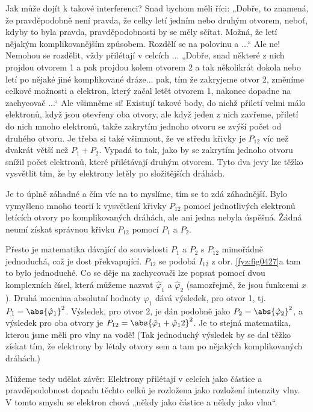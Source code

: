     Jak může dojít k takové interferenci? Snad bychom měli říci: „Dobře, to znamená, že
    pravděpodobně není pravda, že celky letí jedním nebo druhým otvorem, neboť, kdyby to byla
    pravda, pravděpodobnosti by se měly sčítat. Možná, že letí nějakým komplikovanějším způsobem.
    Rozdělí se na polovinu a ...“ Ale ne! Nemohou se rozdělit, vždy přilétají v celcích ... „Dobře,
    snad některé z nich projdou otvorem 1 a pak projdou kolem otvorem 2 a tak několikrát dokola nebo
    letí po nějaké jiné komplikované dráze... pak, tím že zakryjeme otvor 2, změníme celkové
    možnosti a elektron, který začal letět otvorem 1, nakonec dopadne na zachycovač ...“ Ale
    všimněme si! Existují takové body, do nichž přiletí velmi málo elektronů, když jsou otevřeny oba
    otvory, ale když jeden z nich zavřeme, přiletí do nich mnoho elektronů, takže zakrytím jednoho
    otvoru se zvýší počet od druhého otvoru. Je třeba si také všimnout, že ve středu křivky je
    \(P_{12}\) víc než dvakrát větší než \(P_1+P_2\). Vypadá to tak, jako by se zakrytím jednoho
    otvoru snížil počet elektronů, které přilétávají druhým otvorem. Tyto dva jevy lze těžko
    vysvětlit tím, že by elektrony letěly po složitějších dráhách.
    
    Je to úplně záhadné a čím víc na to myslíme, tím se to zdá záhadnější. Bylo vymyšleno mnoho
    teorií k vysvětlení křivky \(P_{12}\)  pomocí jednotlivých elektronů letících otvory po
    komplikovaných dráhách, ale ani jedna nebyla úspěšná. Žádná neumí získat správnou křivku
    \(P_{12}\)  pomocí \(P_1\)  a \(P_2\).
    
    Přesto je matematika dávající do souvislosti \(P_1\)  a \(P_2\) s \(P_{12}\)  mimořádně
    jednoduchá, což je dost překvapující. \(P_{12}\)  se podobá \(I_{12}\) z obr. \ref{fyz:fig0427}a
    tam to bylo jednoduché. Co se děje na zachycovači lze popsat pomocí dvou komplexních čísel,
    která můžeme nazvat \(\hat{\varphi}_1\) a \(\hat{\varphi}_2\) (samozřejmě, že jsou funkcemi
    \(x\)). Druhá mocnina absolutní hodnoty \(\hat{\varphi}_1\)  dává výsledek, pro otvor 1, tj.
    \(P_1=\abs{\hat{\varphi}_1}^2\). Výsledek, pro otvor 2, je dán podobně jako
    \(P_2=\abs{\hat{\varphi}_2}^2\), a výsledek pro oba otvory je \(P_{12}=\abs{\hat{\varphi}_1 +
    \hat{\varphi}_12}^2\). Je to stejná matematika, kterou jsme měli pro vlny na vodě! (Tak
    jednoduchý výsledek by se dal těžko získat tím, že elektrony by létaly otvory sem a tam po
    nějakých komplikovaných dráhách.)
    
    Můžeme tedy udělat závěr: Elektrony přilétají v celcích jako částice a pravděpodobnost dopadu
    těchto celků je rozložena jako rozložení intenzity vlny. V tomto smyslu se elektron chová „někdy
    jako částice a někdy jako vlna“.
    
